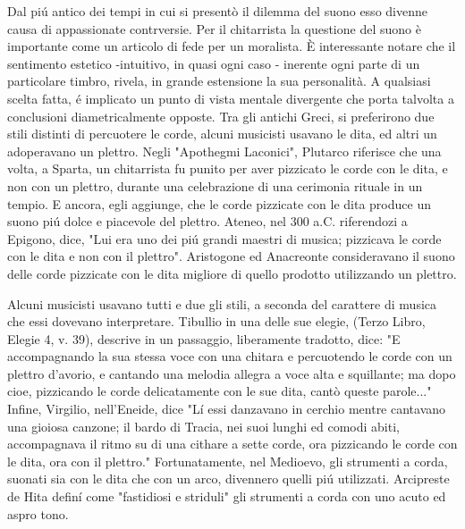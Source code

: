 \documentclass[
11pt, %
a4paper, %
oneside, %
headinclude,footinclude, %
BCOR5mm, %
]{scrartcl}
\begin{document}
\par{Dal piú antico dei tempi in cui si presentò il dilemma del suono esso divenne causa di appassionate contrversie. Per il chitarrista la questione del suono è importante come un articolo di fede per un moralista. È interessante notare che il sentimento estetico -intuitivo, in quasi ogni caso - inerente ogni parte di un particolare timbro, rivela, in grande estensione la sua personalità. A qualsiasi scelta fatta, é implicato un punto di vista mentale divergente che porta talvolta a conclusioni diametricalmente opposte. Tra gli antichi Greci, si preferirono due stili distinti di percuotere le corde, alcuni musicisti usavano le dita, ed altri un adoperavano un plettro. Negli "Apothegmi Laconici", Plutarco riferisce che una volta, a Sparta, un chitarrista fu punito per aver pizzicato le corde con le dita, e non con un plettro, durante una celebrazione di una cerimonia rituale in un tempio. E ancora, egli aggiunge, che le corde pizzicate con le dita produce un suono piú dolce e piacevole del plettro. Ateneo, nel 300 a.C. riferendozi a Epigono, dice, "Lui era uno dei piú grandi maestri di musica; pizzicava le corde con le dita e non con il plettro". Aristogone ed Anacreonte consideravano il suono delle corde pizzicate con le dita migliore di quello prodotto utilizzando un plettro.} \par{Alcuni musicisti usavano tutti e due gli stili, a seconda del carattere di musica che essi dovevano interpretare. Tibullio in una delle sue elegie, (Terzo Libro, Elegie 4, v. 39), descrive in un passaggio, liberamente tradotto, dice: "E accompagnando la sua stessa voce con una chitara e percuotendo le corde con un plettro d'avorio, e cantando una melodia allegra a voce alta e squillante; ma dopo cioe, pizzicando le corde delicatamente con le sue dita, cantò queste parole..." Infine, Virgilio, nell'Eneide, dice "Lí essi danzavano in cerchio mentre cantavano una gioiosa canzone; il bardo di Tracia, nei suoi lunghi ed comodi abiti, accompagnava il ritmo su di una cithare a sette corde, ora pizzicando le corde con le dita, ora con il plettro." Fortunatamente, nel Medioevo, gli strumenti a corda, suonati sia con le dita che con un arco, divennero quelli piú utilizzati. Arcipreste de Hita definí come "fastidiosi e striduli" gli strumenti a corda con uno acuto ed aspro tono.}


\end{document}
